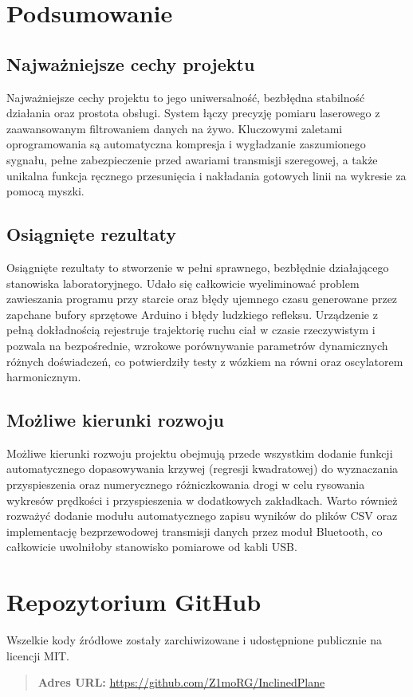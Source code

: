 \documentclass[a4paper,12pt]{article}
\begin{document}
\newpage

\section{Podsumowanie}

\subsection*{Najważniejsze cechy projektu}
\noindent Najważniejsze cechy projektu to jego uniwersalność, bezbłędna stabilność działania oraz prostota obsługi. System łączy precyzję pomiaru laserowego z zaawansowanym filtrowaniem danych na żywo. Kluczowymi zaletami oprogramowania są automatyczna kompresja i wygładzanie zaszumionego sygnału, pełne zabezpieczenie przed awariami transmisji szeregowej, a także unikalna funkcja ręcznego przesunięcia i nakładania gotowych linii na wykresie za pomocą myszki.

\subsection*{Osiągnięte rezultaty}
\noindent Osiągnięte rezultaty to stworzenie w pełni sprawnego, bezbłędnie działającego stanowiska laboratoryjnego. Udało się całkowicie wyeliminować problem zawieszania programu przy starcie oraz błędy ujemnego czasu generowane przez zapchane bufory sprzętowe Arduino i błędy ludzkiego refleksu. Urządzenie z pełną dokładnością rejestruje trajektorię ruchu ciał w czasie rzeczywistym i pozwala na bezpośrednie, wzrokowe porównywanie parametrów dynamicznych różnych doświadczeń, co potwierdziły testy z wózkiem na równi oraz oscylatorem harmonicznym.

\subsection*{Możliwe kierunki rozwoju}
\noindent Możliwe kierunki rozwoju projektu obejmują przede wszystkim dodanie funkcji automatycznego dopasowywania krzywej (regresji kwadratowej) do wyznaczania przyspieszenia oraz numerycznego różniczkowania drogi w celu rysowania wykresów prędkości i przyspieszenia w dodatkowych zakładkach. Warto również rozważyć dodanie modułu automatycznego zapisu wyników do plików CSV oraz implementację bezprzewodowej transmisji danych przez moduł Bluetooth, co całkowicie uwolniłoby stanowisko pomiarowe od kabli USB.



\section*{Repozytorium GitHub}

Wszelkie kody źródłowe zostały zarchiwizowane i udostępnione publicznie na licencji MIT. 

\begin{quote}
    \textbf{Adres URL:} \url{https://github.com/Z1moRG/InclinedPlane}
\end{quote}
\end{document}
